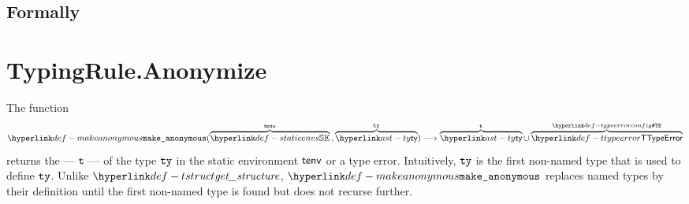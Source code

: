\subsection{Formally}


\section{TypingRule.Anonymize \label{sec:anonymize}}
\hypertarget{def-makeanonymous}{}
\hypertarget{def-underlyingtype}{}
The function
\[
  \makeanonymous(\overname{\staticenvs}{\tenv} \aslsep \overname{\ty}{\tty}) \aslto \overname{\ty}{\vt} \cup \overname{\TTypeError}{\TypeErrorConfig}
\]
returns the \emph{\underlyingtype} --- $\texttt{t}$ --- of the type $\texttt{ty}$ in the static environment $\textsf{tenv}$ or a type error.
Intuitively, $\texttt{ty}$ is the first non-named type that is used to define $\texttt{ty}$. Unlike $\tstruct$,
$\makeanonymous$ replaces named types by their definition until the first non-named type is found but
does not recurse further.

